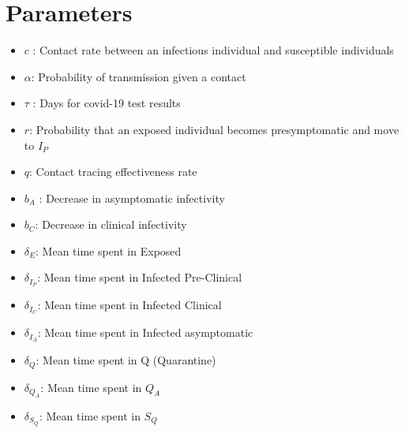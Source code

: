 \documentclass[12pt]{article}
\begin{document}
\section{Parameters} \label{parameters}
\begin{itemize}
\item $c$ : Contact rate between an infectious individual and susceptible individuals
\item $\alpha$: Probability of transmission given a contact
\item $\tau$ : Days for covid-19 test results
\item $r$: Probability that an exposed individual becomes presymptomatic and move to $I_P$
\item $q$: Contact tracing effectiveness rate
\item  $b_A$ : Decrease in asymptomatic infectivity
\item $b_C$: Decrease in clinical infectivity
\item $\delta_E$: Mean time spent in Exposed
\item $\delta_{I_{P}}$: Mean time spent in Infected Pre-Clinical
\item $\delta_{I_{C}}$: Mean time spent in Infected Clinical
\item $\delta_{I_{A}}$: Mean time spent in Infected asymptomatic
\item $\delta_Q$: Mean time spent in Q (Quarantine)
\item $\delta_{Q_{A}}$: Mean time spent in $Q_A$
\item $\delta_{S_{Q}}$: Mean time spent in $S_Q$
\end{itemize}
\end{document}
